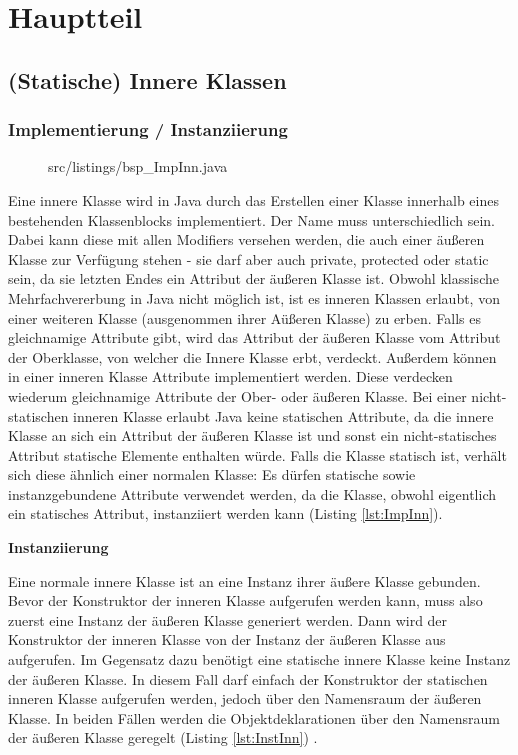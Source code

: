 \chapter{Hauptteil}
\section{(Statische) Innere Klassen}
\subsection {Implementierung / Instanziierung}

\begin{figure}[hbt]
\lstset{language=Java}
 {src/listings/bsp_ImpInn.java}
\end{figure}

Eine innere Klasse wird in Java durch das Erstellen einer Klasse innerhalb eines bestehenden Klassenblocks implementiert.
Der Name muss unterschiedlich sein. Dabei kann diese mit allen Modifiers versehen werden, die auch einer äußeren Klasse zur Verfügung stehen - sie darf aber auch private, protected oder static sein, da sie letzten Endes ein Attribut der äußeren Klasse ist.
Obwohl klassische Mehrfachvererbung in Java nicht möglich ist, ist es inneren Klassen erlaubt, von einer weiteren Klasse (ausgenommen ihrer Aüßeren Klasse) zu erben.
Falls es gleichnamige Attribute gibt, wird das Attribut der äußeren Klasse vom Attribut der Oberklasse, von welcher die Innere Klasse erbt, verdeckt.
Außerdem können in einer inneren Klasse Attribute implementiert werden. Diese verdecken wiederum gleichnamige Attribute der Ober- oder äußeren Klasse.
Bei einer nicht-statischen inneren Klasse erlaubt Java keine statischen Attribute, da die innere Klasse an sich ein Attribut der äußeren Klasse ist und sonst ein nicht-statisches Attribut statische Elemente enthalten würde.
Falls die Klasse statisch ist, verhält sich diese ähnlich einer normalen Klasse: Es dürfen statische sowie instanzgebundene Attribute verwendet werden, da die Klasse, obwohl eigentlich ein statisches Attribut, instanziiert werden kann (Listing \ref{lst:ImpInn}).


{\bf Instanziierung}

Eine normale innere Klasse ist an eine Instanz ihrer äußere Klasse gebunden. Bevor der Konstruktor der inneren Klasse aufgerufen werden kann, muss also zuerst eine Instanz der äußeren Klasse generiert werden.
Dann wird der Konstruktor der inneren Klasse von der Instanz der äußeren Klasse aus aufgerufen.
Im Gegensatz dazu benötigt eine statische innere Klasse keine Instanz der äußeren Klasse.
In diesem Fall darf einfach der Konstruktor der statischen inneren Klasse aufgerufen werden, jedoch über den Namensraum der äußeren Klasse.
In beiden Fällen werden die Objektdeklarationen über den Namensraum der äußeren Klasse geregelt (Listing \ref{lst:InstInn}) \cite{goll2013java}.


